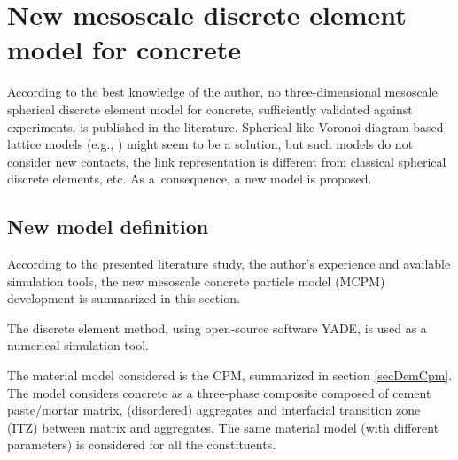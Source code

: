 











\chapter{New mesoscale discrete element model for concrete}\label{chapMCPMNewModel}
According to the best knowledge of the author, no three-dimensional mesoscale spherical discrete element model for concrete, sufficiently validated against experiments, is published in the literature.
Spherical-like Voronoi diagram based lattice models (e.g.,
\cite{
	CambordeMariottiDonze2000a,%
	Cusatis2001a,%
	GrasslRempling2008a,%
	IbrahimbegovicDelaplace2003a,%
	WangLinGu2008a,%
	YipLiLiaoBolander2006a%
}) might seem to be a solution, but such models do not consider new contacts, the link representation is different from classical spherical discrete elements, etc.
As a~consequence, a new model is proposed.




\section{New model definition}

According to the presented literature study, the author's experience and available simulation tools, the new mesoscale concrete particle model (MCPM) development is summarized in this section.

The discrete element method, using open-source software YADE, is used as a numerical simulation tool.

The material model considered is the CPM, summarized in section \ref{secDemCpm}.
The model considers concrete as a three-phase composite composed of cement paste/mortar matrix, (disordered) aggregates and interfacial transition zone (ITZ) between matrix and aggregates.
The same material model (with different parameters) is considered for all the constituents.

